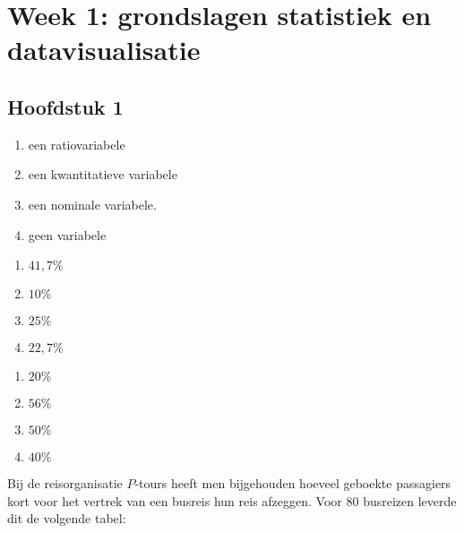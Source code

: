 \chapter*{Week 1: grondslagen statistiek en datavisualisatie}

\section*{Hoofdstuk 1}

\begin{enumerate}[label=(\alph*)]
    \item een ratiovariabele
    \item een kwantitatieve variabele
    \item een nominale variabele.
    \item geen variabele
\end{enumerate}

\begin{enumerate}[label=(\alph*)]
    \item $41,7\%$
    \item $10\%$
    \item $25\%$
    \item $22,7\%$
\end{enumerate}

\begin{enumerate}[label=(\alph*)]
    \item $20\%$
    \item $56\%$
    \item $50\%$
    \item $40\%$
\end{enumerate}

Bij de reisorganisatie $P$-tours heeft men bijgehouden hoeveel geboekte passagiers kort voor het vertrek van een busreis hun reis afzeggen.
Voor 80 busreizen leverde dit de volgende tabel:

